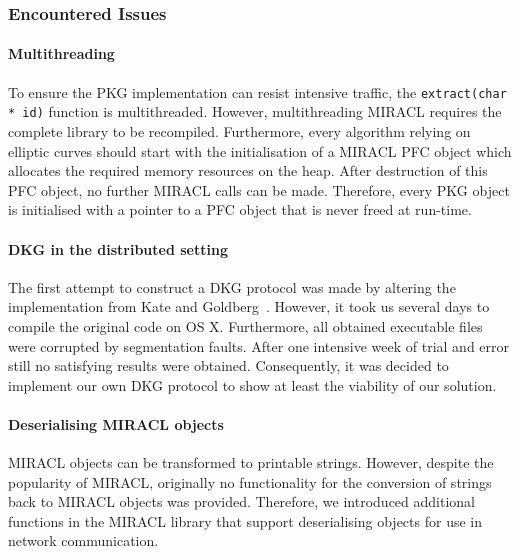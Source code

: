 \subsubsection{Encountered Issues}

\paragraph{Multithreading} To ensure the PKG implementation can resist intensive traffic, the \texttt{extract(char * id)} function is multithreaded. However, multithreading {{MIRACL}} requires the complete library to be recompiled. Furthermore, every algorithm relying on elliptic curves should start with the initialisation of a MIRACL PFC object which allocates the required memory resources on the heap. After destruction of this PFC object, no further MIRACL calls can be made. Therefore, every PKG object is initialised with a pointer to a PFC object that is never freed at run-time.

\paragraph{DKG in the distributed setting} The first attempt to construct a DKG protocol was made by altering the implementation from Kate and Goldberg~\cite{art:KateHG12}. However, it took us several days to compile the original code on OS X. Furthermore, all obtained executable files were corrupted by segmentation faults. After one intensive week of trial and error still no satisfying results were obtained. Consequently, it was decided to implement our own DKG protocol to show at least the viability of our solution.

\paragraph{Deserialising MIRACL objects} MIRACL objects can be transformed to printable strings. However, despite the popularity of MIRACL, originally no functionality for the conversion of strings back to MIRACL objects was provided. Therefore, we introduced additional functions in the MIRACL library that support deserialising objects for use in network communication.

